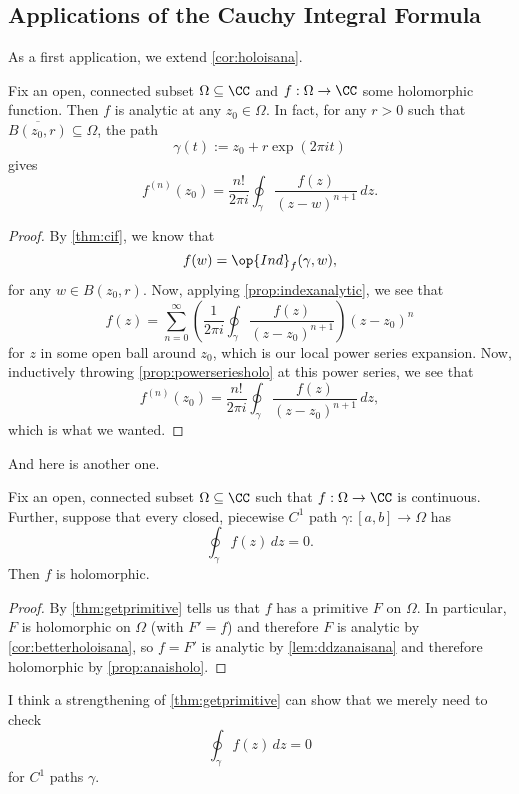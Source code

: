 \subsection{Applications of the Cauchy Integral Formula}
As a first application, we extend \autoref{cor:holoisana}.
\begin{corollary} \label{cor:betterholoisana}
	Fix an open, connected subset $\Omega\subseteq\CC$ and $f:\Omega\to\CC$ some holomorphic function. Then $f$ is analytic at any $z_0\in\Omega$. In fact, for any $r>0$ such that $\overline{B(z_0,r)}\subseteq\Omega$, the path
	\[\gamma(t):=z_0+r\exp(2\pi it)\]
	gives
	\[f^{(n)}(z_0)=\frac{n!}{2\pi i}\oint_\gamma\frac{f(z)}{(z-w)^{n+1}}\,dz.\]
\end{corollary}
\begin{proof}
	By \autoref{thm:cif}, we know that
	\[f(w)=\op{Ind}_f(\gamma,w),\]
	for any $w\in B(z_0,r)$. Now, applying \autoref{prop:indexanalytic}, we see that 
	\[f(z)=\sum_{n=0}^\infty\left(\frac1{2\pi i}\oint_\gamma\frac{f(z)}{(z-z_0)^{n+1}}\right)(z-z_0)^n\]
	for $z$ in some open ball around $z_0$, which is our local power series expansion. Now, inductively throwing \autoref{prop:powerseriesholo} at this power series, we see that
	\[f^{(n)}(z_0)=\frac{n!}{2\pi i}\oint_\gamma\frac{f(z)}{(z-z_0)^{n+1}}\,dz,\]
	which is what we wanted.
\end{proof}
And here is another one.
\begin{theorem}[Morera] \label{thm:morera}
	Fix an open, connected subset $\Omega\subseteq\CC$ such that $f:\Omega\to\CC$ is continuous. Further, suppose that every closed, piecewise $C^1$ path $\gamma:[a,b]\to\Omega$ has
	\[\oint_\gamma f(z)\,dz=0.\]
	Then $f$ is holomorphic.
\end{theorem}
\begin{proof}
	By \autoref{thm:getprimitive} tells us that $f$ has a primitive $F$ on $\Omega$. In particular, $F$ is holomorphic on $\Omega$ (with $F'=f$) and therefore $F$ is analytic by \autoref{cor:betterholoisana}, so $f=F'$ is analytic by \autoref{lem:ddzanaisana} and therefore holomorphic by \autoref{prop:anaisholo}.
\end{proof}
\begin{remark}
	I think a strengthening of \autoref{thm:getprimitive} can show that we merely need to check
	\[\oint_\gamma f(z)\,dz=0\]
	for $C^1$ paths $\gamma$.
\end{remark}

